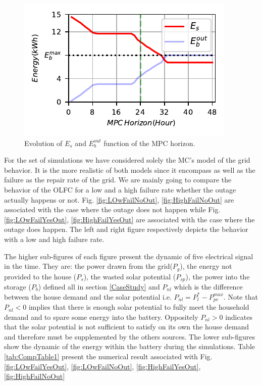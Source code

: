 \documentclass{ifacconf}
\begin{document}
\begin{figure}[!htb]
        \begin{center}
                \includegraphics[width=.9\columnwidth]{Figures/MPCHorr.pdf}
        \end{center}
        \vspace{-8px}
        \caption{Evolution of $E_s$ and $E_b^{out}$ function of the MPC horizon.
        }
        \label{fig:Es&EbOut}
\end{figure} 
  For the set of simulations we have considered solely the MC's model of the grid behavior. It is the more realistic of both models since it encompass as well as the failure as the repair rate of the grid. We are mainly going to compare the behavior of the OLFC for a low and a high failure rate whether the outage actually happens or not. Fig. \ref{fig:LOwFailNoOut}, \ref{fig:HighFailNoOut} are associated with the case where the outage does not happen while Fig. \ref{fig:LOwFailYesOut}, \ref{fig:HighFailYesOut} are associated with the case where the outage does happen. The left and right figure respectively depicts the behavior with a low and high failure rate. 
  
  The higher sub-figures of each figure present the dynamic of  five electrical signal in the time. They are: the power drawn from the grid($P_g$), the energy not provided to the house ($P_s$), the wasted solar potential ($P_{sp}$), the power into the storage ($P_b$) defined all in section \ref{CaseStudy} and $P_{nl}$ which is the difference between the house demand and the solar potential i.e. $P_{nl} = P_l^* - P_{pv}^{max}$. Note that $P_{nl} < 0$ implies that there is enough solar potential to fully meet the household demand and to spare some energy into the battery. Oppositely $P_{nl} > 0$  indicates that the solar potential is not sufficient to satisfy on its own the house demand and therefore must be supplemented by the others sources. The lower sub-figures show the dynamic of the energy within the battery during the simulations. Table \ref{tab:CompTable1} present the numerical result associated with Fig.\ref{fig:LOwFailYesOut}, \ref{fig:LOwFailNoOut}, \ref{fig:HighFailYesOut}, \ref{fig:HighFailNoOut} 
  
\end{document}

